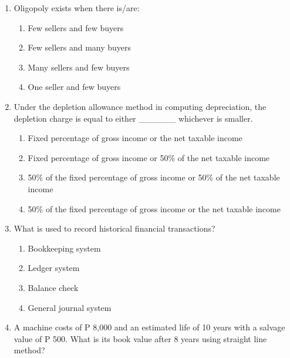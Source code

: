 \documentclass[11pt,a4paper]{article}
\begin{document}
\begin{enumerate}
\item{Oligopoly exists when there is/are:}
\begin{enumerate}[label=\Alph*.]
\item{Few sellers and few buyers}
\item{Few sellers and many buyers}
\item{Many sellers and few buyers}
\item{One seller and few buyers}
\end{enumerate}
\item{Under the depletion allowance method in computing depreciation, the depletion charge is equal to either \_\_\_\_\_\_ whichever is smaller.}
\begin{enumerate}[label=\Alph*.]
\item{Fixed percentage of gross income or the net taxable income}
\item{Fixed percentage of gross income or 50\% of the net taxable income}
\item{50\% of the fixed percentage of gross income or 50\% of the net taxable income}
\item{50\% of the fixed percentage of gross income or the net taxable income}
\end{enumerate}
\item{What is used to record historical financial transactions?}
\begin{enumerate}[label=\Alph*.]
\item{Bookkeeping system}
\item{Ledger system}
\item{Balance check}
\item{General journal system}
\end{enumerate}
\item{A machine costs of P 8,000 and an estimated life of 10 years with a salvage value of P 500. What is its book value after 8 years using straight line method?}
\\
\end{enumerate}
\end{document}
